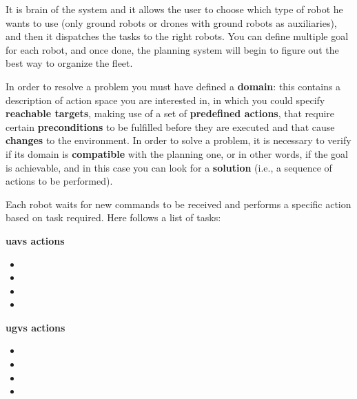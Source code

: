 It is brain of the system and it allows the user to choose which type of robot he wants to use (only ground robots or drones with ground robots as auxiliaries), and then it dispatches the tasks to the right robots. You can define multiple goal for each robot, and once done, the planning system will begin to figure out the best way to organize the fleet.

In order to resolve a problem you must have defined a \textbf{domain}: this contains a description of action space you are interested in, in which you could specify \textbf{reachable targets}, making use of a set of \textbf{predefined actions}, that require certain \textbf{preconditions} to be fulfilled before they are executed and that cause \textbf{changes} to the environment. In order to solve a problem, it is necessary to verify if its domain is \textbf{compatible} with the planning one, or in other words, if the goal is achievable, and in this case you can look for a \textbf{solution} (i.e., a sequence of actions to be performed).

Each robot waits for new commands to be received and performs a specific action based on task required. Here follows a list of tasks:

\bigskip

\begin{minipage}[h]{0.45\textwidth}
  \centering
  \textbf{\acrshort{uavs} actions}
  \begin{itemize}
    \centering
    \item {}
    \item {}    
    \item {}
    \item {}
  \end{itemize}
\end{minipage}
\begin{minipage}[h]{0.45\textwidth}
  \centering
  \textbf{\acrshort{ugvs} actions}
    \begin{itemize}
      \centering
      \item {}
      \item {}
      \item {}
      \item {}
    \end{itemize}
\end{minipage}

\bigskip

